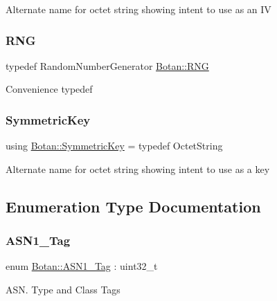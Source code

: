 Alternate name for octet string showing intent to use as an IV \mbox{\label{namespace_botan_a45fbc8259840830135e2cf779839ddfa}} 
\subsubsection{\texorpdfstring{R\+NG}{RNG}}
{\footnotesize\ttfamily typedef Random\+Number\+Generator \hyperlink{namespace_botan_a45fbc8259840830135e2cf779839ddfa}{Botan\+::\+R\+NG}}

Convenience typedef \mbox{\label{namespace_botan_a89cf6c3513428f524454d01830221a88}} 
\subsubsection{\texorpdfstring{Symmetric\+Key}{SymmetricKey}}
{\footnotesize\ttfamily using \hyperlink{namespace_botan_a89cf6c3513428f524454d01830221a88}{Botan\+::\+Symmetric\+Key} = typedef Octet\+String}

Alternate name for octet string showing intent to use as a key 

\subsection{Enumeration Type Documentation}
\mbox{\label{namespace_botan_acc1ab433420bdddbcfe52dbbd94e8576}} 
\subsubsection{\texorpdfstring{A\+S\+N1\+\_\+\+Tag}{ASN1\_Tag}}
{\footnotesize\ttfamily enum \hyperlink{namespace_botan_acc1ab433420bdddbcfe52dbbd94e8576}{Botan\+::\+A\+S\+N1\+\_\+\+Tag} \+: uint32\+\_\+t}

A\+S\+N. Type and Class Tags \mbox{\label{namespace_botan_ae1e907dc90937bdda30f65216e68ff2b}} 
